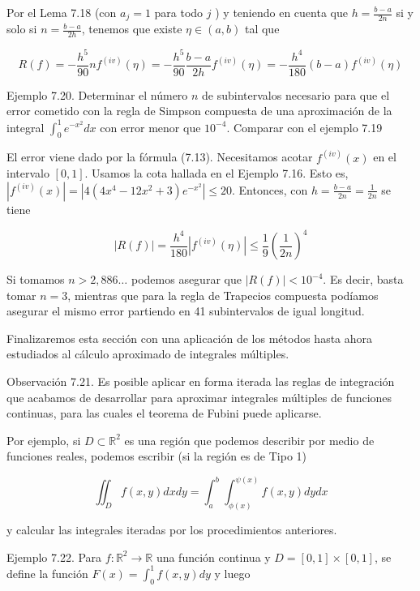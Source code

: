 \documentclass[10pt]{book}
\begin{document}
Por el Lema 7.18 (con $a_{j}=1$ para todo $j$ ) y teniendo en cuenta que $h=\frac{b-a}{2 n}$ si y solo si $n=\frac{b-a}{2 h}$, tenemos que existe $\eta \in(a, b)$ tal que


\begin{equation*}
R(f)=-\frac{h^{5}}{90} n f^{(i v)}(\eta)=-\frac{h^{5}}{90} \frac{b-a}{2 h} f^{(i v)}(\eta)=-\frac{h^{4}}{180}(b-a) f^{(i v)}(\eta) \tag{7.13}
\end{equation*}


Ejemplo 7.20. Determinar el número $n$ de subintervalos necesario para que el error cometido con la regla de Simpson compuesta de una aproximación de la integral $\int_{0}^{1} e^{-x^{2}} d x$ con error menor que $10^{-4}$. Comparar con el ejemplo 7.19

El error viene dado por la fórmula (7.13). Necesitamos acotar $f^{(i v)}(x)$ en el intervalo $[0,1]$. Usamos la cota hallada en el Ejemplo 7.16. Esto es, $\left|f^{(i v)}(x)\right|=\left|4\left(4 x^{4}-12 x^{2}+3\right) e^{-x^{2}}\right| \leq 20$. Entonces, con $h=\frac{b-a}{2 n}=\frac{1}{2 n}$ se tiene

$$
|R(f)|=\frac{h^{4}}{180}\left|f^{(i v)}(\eta)\right| \leq \frac{1}{9}\left(\frac{1}{2 n}\right)^{4}
$$

Si tomamos $n>2,886 \ldots$ podemos asegurar que $|R(f)|<10^{-4}$. Es decir, basta tomar $n=3$, mientras que para la regla de Trapecios compuesta podíamos asegurar el mismo error partiendo en 41 subintervalos de igual longitud.

Finalizaremos esta sección con una aplicación de los métodos hasta ahora estudiados al cálculo aproximado de integrales múltiples.

Observación 7.21. Es posible aplicar en forma iterada las reglas de integración que acabamos de desarrollar para aproximar integrales múltiples de funciones continuas, para las cuales el teorema de Fubini puede aplicarse.

Por ejemplo, si $D \subset \mathbb{R}^{2}$ es una región que podemos describir por medio de funciones reales, podemos escribir (si la región es de Tipo 1)

$$
\iint_{D} f(x, y) d x d y=\int_{a}^{b} \int_{\phi(x)}^{\psi(x)} f(x, y) d y d x
$$

y calcular las integrales iteradas por los procedimientos anteriores.

Ejemplo 7.22. Para $f: \mathbb{R}^{2} \rightarrow \mathbb{R}$ una función continua y $D=[0,1] \times[0,1]$, se define la función $F(x)=\int_{0}^{1} f(x, y) d y$ y luego
\end{document}
